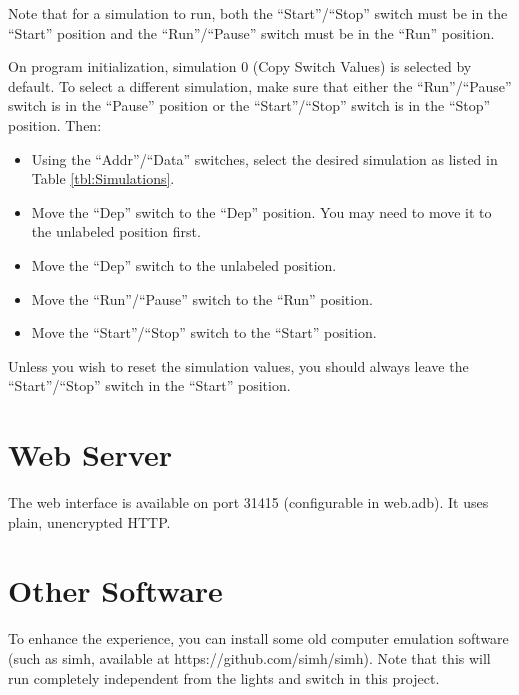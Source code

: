 \documentclass[10pt, openany]{book}
\newcommand{\switch}[2]{``#1''/``#2''}
\newcommand{\position}[1]{``#1''}
\begin{document}
Note that for a simulation to run, both the \switch{Start}{Stop} switch must be in the \position{Start} position and the \switch{Run}{Pause} switch must be in the \position{Run} position.

On program initialization, simulation 0 (Copy Switch Values) is selected by default.  To select a different simulation, make sure that either the \switch{Run}{Pause} switch is in the \position{Pause} position or the \switch{Start}{Stop} switch is in the \position{Stop} position.  Then:
\begin{itemize}
  \item Using the \switch{Addr}{Data} switches, select the desired simulation as listed in Table \ref{tbl:Simulations}.
  \item Move the \position{Dep} switch to the \position{Dep} position.  You may need to move it to the unlabeled position first.
  \item Move the \position{Dep} switch to the unlabeled position.
  \item Move the \switch{Run}{Pause} switch to the \position{Run} position.
  \item Move the \switch{Start}{Stop} switch to the \position{Start} position.
\end{itemize}

Unless you wish to reset the simulation values, you should always leave the \switch{Start}{Stop} switch in the \position{Start} position.

\section{Web Server}
The web interface is available on port 31415 (configurable in web.adb).  It uses plain, unencrypted HTTP.

\section{Other Software}
To enhance the experience, you can install some old computer emulation software (such as simh, available at https://github.com/simh/simh).  Note that this will run completely independent from the lights and switch in this project.
\end{document}
